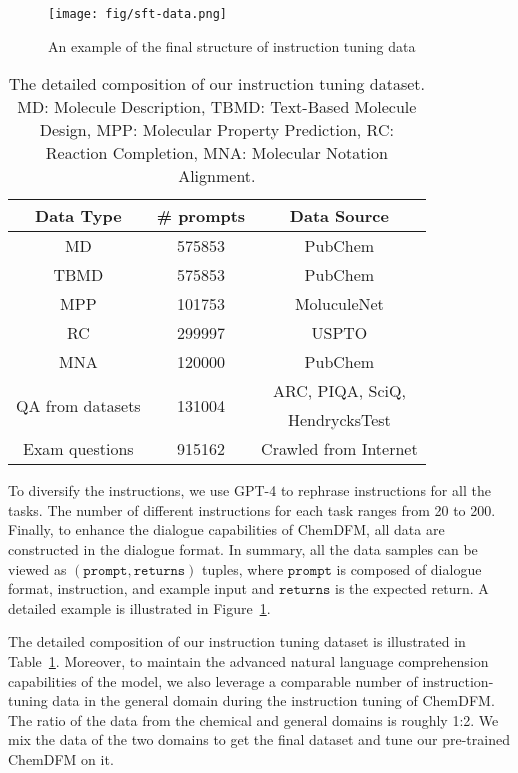 \begin{figure}
    \centering
    \texttt{[image: fig/sft-data.png]}
    \caption{An example of the final structure of instruction tuning data}
    \label{fig:data}
    \vspace{-3mm}
\end{figure}
\begin{table}[t]
    \centering
    \begin{tabular}{ccc}
    \toprule
        Data Type & \# prompts & Data Source \\
    \midrule
        MD & 575853 & PubChem \\
        TBMD & 575853 & PubChem \\
        MPP & 101753 & MoluculeNet \\
        RC & 299997 & USPTO \\
        MNA & 120000 & PubChem \\
        \multirow{2}{*}{QA from datasets} & \multirow{2}{*}{131004} & ARC, PIQA, SciQ,\\
         & & HendrycksTest \\
        Exam questions & 915162 & Crawled from Internet \\
    \bottomrule
    \end{tabular}
    \caption{The detailed composition of our instruction tuning dataset. MD: Molecule Description, TBMD: Text-Based Molecule Design, MPP: Molecular Property Prediction, RC: Reaction Completion, MNA: Molecular Notation Alignment.}
    \label{tab:data}
    \vspace{-3mm}
\end{table}

To diversify the instructions, we use GPT-4 to rephrase instructions for all the tasks. The number of different instructions for each task ranges from 20 to 200. Finally, to enhance the dialogue capabilities of ChemDFM, all data are constructed in the dialogue format. In summary, all the data samples can be viewed as $(\mathtt{prompt}, \mathtt{returns})$ tuples, where $\mathtt{prompt}$ is composed of dialogue format, instruction, and example input and $\mathtt{returns}$ is the expected return. A detailed example is illustrated in Figure~\ref{fig:data}.

The detailed composition of our instruction tuning dataset is illustrated in Table~\ref{tab:data}. Moreover, to maintain the advanced natural language comprehension capabilities of the model, we also leverage a comparable number of instruction-tuning data in the general domain during the instruction tuning of ChemDFM. The ratio of the data from the chemical and general domains is roughly 1:2. We mix the data of the two domains to get the final dataset and tune our pre-trained ChemDFM on it.

